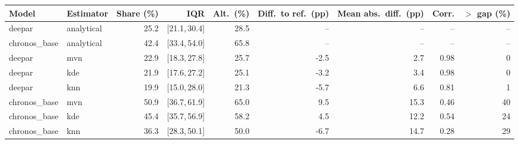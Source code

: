 \begin{tabular}{llrrrrrrr}
\toprule
Model & Estimator & Share (\%) & IQR & Alt.\ (\%) & Diff.\ to ref.\ (pp) & Mean abs.\ diff.\ (pp) & Corr. & $>$ gap (\%) \\
\midrule
deepar & analytical & 25.2 & [21.1,\,30.4] & 28.5 & -- & -- & -- & -- \\
chronos_base & analytical & 42.4 & [33.4,\,54.0] & 65.8 & -- & -- & -- & -- \\
deepar & mvn & 22.9 & [18.3,\,27.8] & 25.7 & -2.5 & 2.7 & 0.98 & 0 \\
deepar & kde & 21.9 & [17.6,\,27.2] & 25.1 & -3.2 & 3.4 & 0.98 & 0 \\
deepar & knn & 19.9 & [15.0,\,28.0] & 21.3 & -5.7 & 6.6 & 0.81 & 1 \\
chronos_base & mvn & 50.9 & [36.7,\,61.9] & 65.0 & 9.5 & 15.3 & 0.46 & 40 \\
chronos_base & kde & 45.4 & [35.7,\,56.9] & 58.2 & 4.5 & 12.2 & 0.54 & 24 \\
chronos_base & knn & 36.3 & [28.3,\,50.1] & 50.0 & -6.7 & 14.7 & 0.28 & 29 \\
\bottomrule
\end{tabular}
